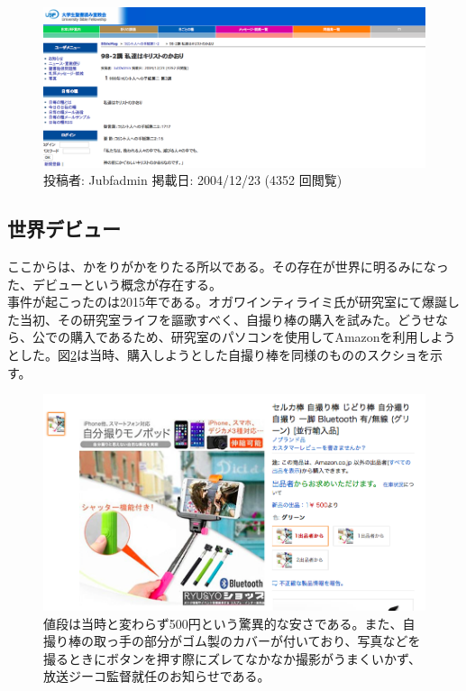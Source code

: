 \begin{figure}[H]
  \centering
  \includegraphics[clip,scale=0.4]{./section/Kawori/figures/ufb.png}
  \caption{投稿者: Jubfadmin 掲載日: 2004/12/23 (4352 回閲覧)}
\label{ufb}
\end{figure}

\subsection{世界デビュー}
ここからは、かをりがかをりたる所以である。その存在が世界に明るみになった、デビューという概念が存在する。\\
事件が起こったのは2015年である。オガワインティライミ氏が研究室にて爆誕した当初、その研究室ライフを謳歌すべく、自撮り棒の購入を試みた。どうせなら、公での購入であるため、研究室のパソコンを使用してAmazonを利用しようとした。図\ref{jidoribou}は当時、購入しようとした自撮り棒を同様のもののスクショを示す。

\begin{figure}[H]
  \centering
  \includegraphics[clip,scale=0.4]{./section/Kawori/figures/jidoribou}
  \caption{値段は当時と変わらず500円という驚異的な安さである。また、自撮り棒の取っ手の部分がゴム製のカバーが付いており、写真などを撮るときにボタンを押す際にズレてなかなか撮影がうまくいかず、放送ジーコ監督就任のお知らせである。}
\label{jidoribou}
\end{figure}

